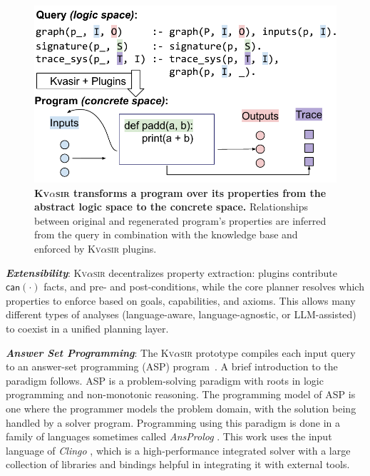 \documentclass[nonacm,sigplan,review]{acmart}
\newcommand{\sys}{{\scshape Kv{$\alpha$}sir}\xspace}
\newcommand{\heading}[1]{\vspace{2pt}\noindent\textbf{\emph{#1}}:\enspace}
\begin{document}
\begin{figure}[t]
\centering
  \includegraphics[width=.9\columnwidth]{figs/kvasir_logic-space.pdf}
  \caption{\textbf{\sys transforms a program over its properties from the abstract logic space to the concrete space.}
  Relationships between original and regenerated program's properties are inferred 
  from the query in combination with the knowledge base and enforced by \sys plugins.
  }
  \label{fig:logic-to-concrete}
\end{figure}


\heading{Extensibility}
\sys decentralizes property extraction: plugins contribute $\mathsf{can}(\cdot)$ facts, and pre- and post-conditions, while the core planner resolves which properties to enforce based on goals, capabilities, and axioms.
This allows many different types of analyses (language-aware, language-agnostic, or LLM-assisted)
to coexist in a unified planning layer.

\heading{Answer Set Programming}
The \sys prototype compiles each input query to an answer-set programming (ASP) program~\cite{Eiter_2009}.
A brief introduction to the paradigm follows.
ASP \cite{Gelfond_2000, Eiter_2009} is a problem-solving paradigm with roots in logic programming and non-monotonic reasoning.
The programming 
model of ASP is one where the programmer models
the problem domain, with the solution being handled by a solver program.
Programming using this paradigm is done in a family of languages sometimes called \textit{AnsProlog} \cite{Gelfond_2002}.
This work uses the input language of \textit{Clingo} \cite{DBLP:journals/corr/GebserKKS14}, which 
is a high-performance integrated solver with a large collection of libraries and bindings helpful in integrating it with external tools.
\end{document}

